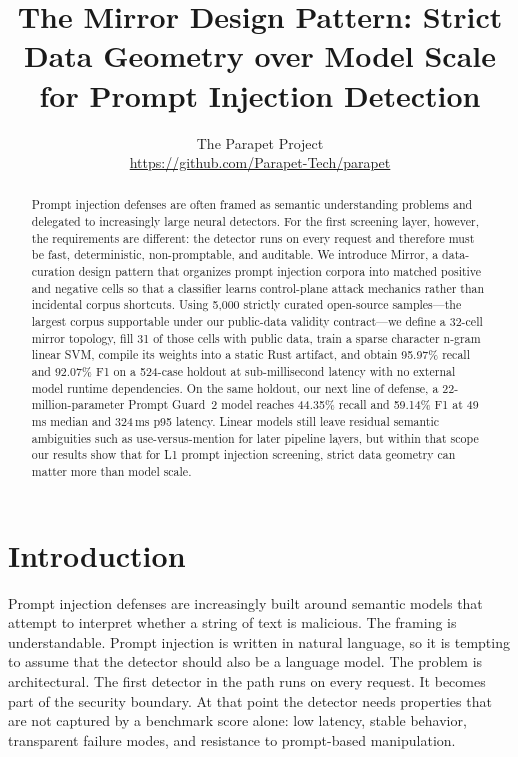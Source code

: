 \documentclass[11pt,a4paper]{article}
\title{The Mirror Design Pattern: Strict Data Geometry over Model Scale\\for Prompt Injection Detection}
\author{
    The Parapet Project \\
    \url{https://github.com/Parapet-Tech/parapet}
  }
\date{}
\begin{document}
\maketitle

\begin{abstract}

Prompt injection defenses are often framed as semantic understanding
problems and delegated to increasingly large neural detectors. For the
first screening layer, however, the requirements are different: the
detector runs on every request and therefore must be fast,
deterministic, non-promptable, and auditable. We introduce Mirror, a
data-curation design pattern that organizes prompt injection corpora
into matched positive and negative cells so that a classifier learns
control-plane attack mechanics rather than incidental corpus shortcuts.
Using 5,000 strictly curated open-source samples---the largest corpus
supportable under our public-data validity contract---we define a
32-cell mirror topology, fill 31 of those cells with public data, train
a sparse character n-gram linear SVM, compile its weights into a static
Rust artifact, and obtain 95.97\% recall and 92.07\% F1 on a 524-case
holdout at sub-millisecond latency with no external model runtime
dependencies. On the same holdout, our next line of defense, a
22-million-parameter Prompt Guard~2 model reaches 44.35\% recall and
59.14\% F1 at 49\,ms median and 324\,ms p95 latency. Linear models
still leave residual semantic ambiguities such as use-versus-mention for
later pipeline layers, but within that scope our results show that for
L1 prompt injection screening, strict data geometry can matter more than
model scale.

\end{abstract}

\section{Introduction}
\label{sec:intro}

Prompt injection defenses are increasingly built around semantic models
that attempt to interpret whether a string of text is malicious. The
framing is understandable. Prompt injection is written in natural
language, so it is tempting to assume that the detector should also be a
language model. The problem is architectural. The first detector in the
path runs on every request. It becomes part of the security boundary. At
that point the detector needs properties that are not captured by a
benchmark score alone: low latency, stable behavior, transparent failure
modes, and resistance to prompt-based manipulation.
\end{document}
